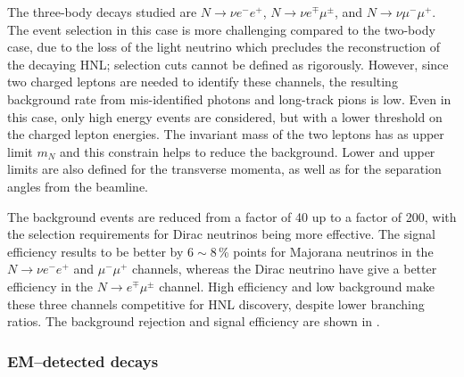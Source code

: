 The three-body decays studied are $N\to \nu e^- e^+$, $N\to \nu e^\mp \mu^\pm$, and $N\to \nu \mu^- \mu^+$.
The event selection in this case is more challenging compared to the two-body case, due to the loss of the light neutrino %
which precludes the reconstruction of the decaying HNL; selection cuts cannot be defined as rigorously. 
However, since two charged leptons are needed to identify these channels, the resulting background rate %
from mis-identified photons and long-track pions is low.
Even in this case, only high energy events are considered, but with a lower threshold on the charged lepton energies.
The invariant mass of the two leptons has as upper limit $m_N$ and this constrain helps to reduce the background.
Lower and upper limits are also defined for the transverse momenta, as well as for the separation angles from the beamline.

The background events are reduced from a factor of 40 up to a factor of 200, with the selection requirements %
for Dirac neutrinos being more effective.
The signal efficiency results to be better by $6\sim8$\,\% points for Majorana neutrinos in the $N\to \nu e^- e^+$ and $\mu^-\mu^+$ %
channels, whereas the Dirac neutrino have give a better efficiency in the $N\to e^\mp \mu^\pm$ channel.
High efficiency and low background make these three channels competitive for HNL discovery, %
despite lower branching ratios.
The background rejection and signal efficiency are shown in .

\subsubsection{EM--detected decays}


